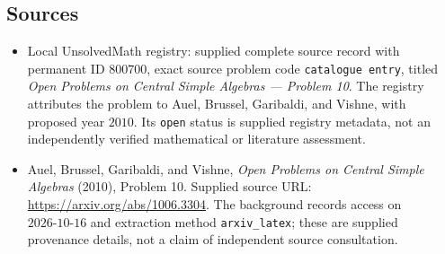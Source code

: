 \documentclass[11pt]{article}
\begin{document}
\subsection{Sources}
\begin{itemize}
\item Local UnsolvedMath registry: supplied complete source record with permanent ID \(800700\), exact source problem code \texttt{catalogue entry}, titled \emph{Open Problems on Central Simple Algebras --- Problem 10}. The registry attributes the problem to Auel, Brussel, Garibaldi, and Vishne, with proposed year \(2010\). Its \texttt{open} status is supplied registry metadata, not an independently verified mathematical or literature assessment.
\item Auel, Brussel, Garibaldi, and Vishne, \emph{Open Problems on Central Simple Algebras} (2010), Problem 10. Supplied source URL: \url{https://arxiv.org/abs/1006.3304}. The background records access on \(2026\text{-}10\text{-}16\) and extraction method \texttt{arxiv\_latex}; these are supplied provenance details, not a claim of independent source consultation.
\end{itemize}
\end{document}
